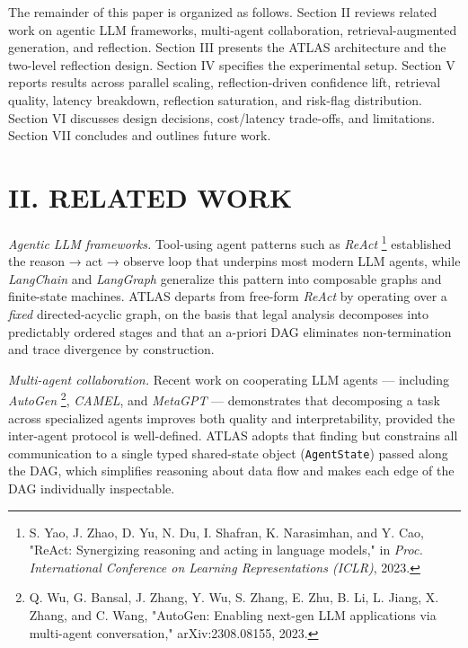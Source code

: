 \documentclass[
  twocolumn]{article}
\begin{document}
The remainder of this paper is organized as follows. Section II reviews
related work on agentic LLM frameworks, multi-agent collaboration,
retrieval-augmented generation, and reflection. Section III presents the
ATLAS architecture and the two-level reflection design. Section IV
specifies the experimental setup. Section V reports results across
parallel scaling, reflection-driven confidence lift, retrieval quality,
latency breakdown, reflection saturation, and risk-flag distribution.
Section VI discusses design decisions, cost/latency trade-offs, and
limitations. Section VII concludes and outlines future work.

\section{II. RELATED WORK}\label{ii.-related-work}

\emph{Agentic LLM frameworks.} Tool-using agent patterns such as
\emph{ReAct} \footnote{S. Yao, J. Zhao, D. Yu, N. Du, I. Shafran, K.
  Narasimhan, and Y. Cao, "ReAct: Synergizing reasoning and acting in
  language models," in \emph{Proc. International Conference on Learning
  Representations (ICLR)}, 2023.} established the reason → act → observe
loop that underpins most modern LLM agents, while \emph{LangChain} and
\emph{LangGraph} generalize this pattern into composable graphs and
finite-state machines. ATLAS departs from free-form \emph{ReAct} by
operating over a \emph{fixed} directed-acyclic graph, on the basis that
legal analysis decomposes into predictably ordered stages and that an
a-priori DAG eliminates non-termination and trace divergence by
construction.

\emph{Multi-agent collaboration.} Recent work on cooperating LLM agents
--- including \emph{AutoGen} \footnote{Q. Wu, G. Bansal, J. Zhang, Y.
  Wu, S. Zhang, E. Zhu, B. Li, L. Jiang, X. Zhang, and C. Wang,
  "AutoGen: Enabling next-gen LLM applications via multi-agent
  conversation," arXiv:2308.08155, 2023.}, \emph{CAMEL}, and
\emph{MetaGPT} --- demonstrates that decomposing a task across
specialized agents improves both quality and interpretability, provided
the inter-agent protocol is well-defined. ATLAS adopts that finding but
constrains all communication to a single typed shared-state object
(\texttt{AgentState}) passed along the DAG, which simplifies reasoning
about data flow and makes each edge of the DAG individually inspectable.
\end{document}
